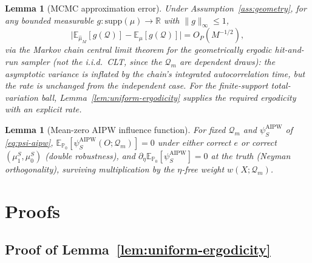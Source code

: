 \documentclass[11pt]{article}
\theoremstyle{plain}
\newtheorem{lemma}[theorem]{Lemma}
\theoremstyle{definition}
\theoremstyle{remark}
\newcommand{\E}{\mathbb{E}}
\newcommand{\PP}{\mathbb{P}}
\newcommand{\R}{\mathbb{R}}
\newcommand{\Q}{\mathcal{Q}}
\newcommand{\Qhat}{\widehat{\mu}_M}
\begin{document}
\begin{lemma}[MCMC approximation error]\label{lem:mcmc-error}
Under Assumption~\ref{ass:geometry}, for any bounded measurable
$g:\mathrm{supp}(\mu)\to\R$ with $\|g\|_\infty\le1$,
\[
    \big|\E_{\Qhat}[g(\Q)]-\E_\mu[g(\Q)]\big| = O_P(M^{-1/2}),
\]
via the Markov chain central limit theorem for the geometrically ergodic hit-and-run
sampler (not the i.i.d.\ CLT, since the $\Q_m$ are dependent draws): the asymptotic
variance is inflated by the chain's integrated autocorrelation time, but the rate is
unchanged from the independent case. For the finite-support total-variation ball,
Lemma~\ref{lem:uniform-ergodicity} supplies the required ergodicity with an explicit
rate.
\end{lemma}

\begin{lemma}[Mean-zero AIPW influence function]\label{lem:if-meanzero}
For fixed $\Q_m$ and $\psi_S^{\mathrm{AIPW}}$ of \eqref{eq:psi-aipw},
$\E_{\PP_0}[\psi_S^{\mathrm{AIPW}}(O;\Q_m)]=0$ under either correct $e$ or correct
$(\mu_1^S,\mu_0^S)$ (double robustness), and $\partial_\eta\E_{\PP_0}[\psi_S^{\mathrm{AIPW}}]=0$
at the truth (Neyman orthogonality), surviving multiplication by the $\eta$-free
weight $w(X;\Q_m)$.
\end{lemma}

\section{Proofs}\label{app:proofs}

\subsection{Proof of Lemma~\ref{lem:uniform-ergodicity}}\label{app:proof-uniform-ergodicity}
\end{document}
